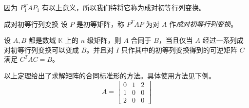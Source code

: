 因为 $P_1^T A P_1$ 有以上意义，所以我们特将它称为成对初等行列变换。

\begin{definition}{成对初等行列变换}
	设 $P$ 是初等矩阵，称 $P^T A P$ 为对 $A$ 作\emph{成对初等行列变换}。
\end{definition}

\begin{theorem}
	设 $A, B$ 都是数域 $\mathbb K$ 上的 $n$ 级矩阵，则 $A$ 合同于 $B$，当且仅当 $A$ 经过一系列成对初等行列变换可以变成 $B$。并且对 $I$ 只作其中的初等列变换得到的可逆矩阵 $C$ 满足 $C^TAC = B$。
\end{theorem}

以上定理给出了求解矩阵的合同标准形的方法。具体使用方法见下例。
$$
A =
\begin{bmatrix}
	0 & 1 & 2
	\\
	1 & 0 & 0
	\\
	2 & 0 & 0
\end{bmatrix}
$$

